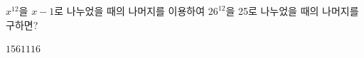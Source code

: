 $x^{12}$을 $x-1$로 나누었을 때의 나머지를 이용하여 $26^{12}$을 25로 나누었을 때의 나머지를 구하면?
\begin{choices32}{$1$}{$5$}{$6$}{$11$}{$16$}\end{choices32}

